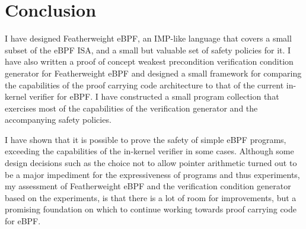 \section{Conclusion}
\label{sec:conclusion}

I have designed Featherweight eBPF, an IMP-like language that covers a small subset of the eBPF ISA, and a small but valuable set of safety policies for it. I have also written a proof of concept weakest precondition verification condition generator for Featherweight eBPF and designed a small framework for comparing the capabilities of the proof carrying code architecture to that of the current in-kernel verifier for eBPF.
I have constructed a small program collection that exercises most of the capabilities of the verification generator and the accompanying safety policies.

I have shown that it is possible to prove the safety of simple eBPF programs, exceeding the capabilities of the in-kernel verifier in some cases. 
Although some design decisions such as the choice not to allow pointer arithmetic turned out to be a major impediment for the expressiveness of programs and thus experiments, my assessment of Featherweight eBPF and the verification condition generator based on the experiments, is that there is a lot of room for improvements, but a promising foundation on which to continue working towards proof carrying code for eBPF. 


